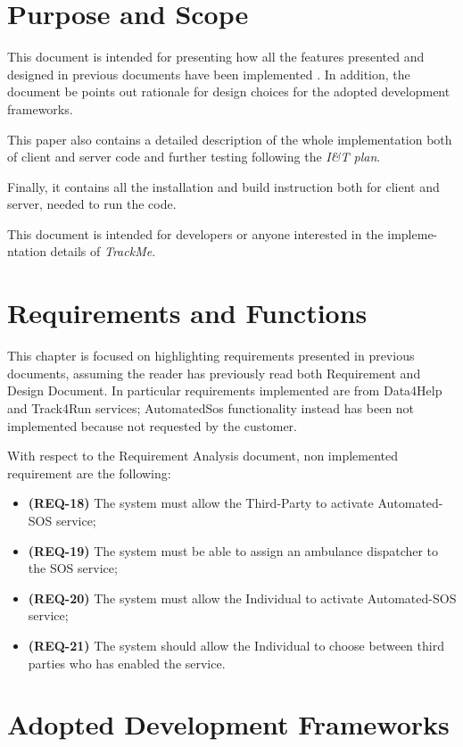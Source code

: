 \documentclass[a4paper]{article}
\begin{document}

\tableofcontents
\newpage
{}
\section{Purpose and Scope}
This document is intended for presenting how all the features presented and designed in previous documents have been implemented \cite{dd}\cite{rasd}. In addition, the document be points out rationale for design choices for the adopted development frameworks.

This paper also contains a detailed description of the whole implementation both of client and server code and further testing following the \textit{I\&T plan}.

Finally, it contains all the installation and build instruction both for client and server, needed to run the code.

This document is intended for developers or anyone interested in the impleme-\newline ntation details of \textit{TrackMe}.

\section{Requirements and Functions}
This chapter is focused on highlighting requirements presented in previous documents, assuming the reader has previously read both Requirement and Design Document. In particular requirements implemented are from Data4Help and Track4Run services; AutomatedSos functionality instead has been not implemented because not requested by the customer.

With respect to the Requirement Analysis document, non implemented requirement are the following:
\begin{itemize}
    \item \textbf{(REQ-18)} The system must allow the Third-Party to activate Automated-SOS service;
    \item \textbf{(REQ-19)} The system must be able to assign an ambulance dispatcher to the SOS service;
    \item \textbf{(REQ-20)} The system must allow the Individual to activate Automated-SOS service;
    \item \textbf{(REQ-21)} The system should allow the Individual to choose between third parties who has enabled the service.
\end{itemize}

\newpage
\section{Adopted Development Frameworks}
\end{document}
